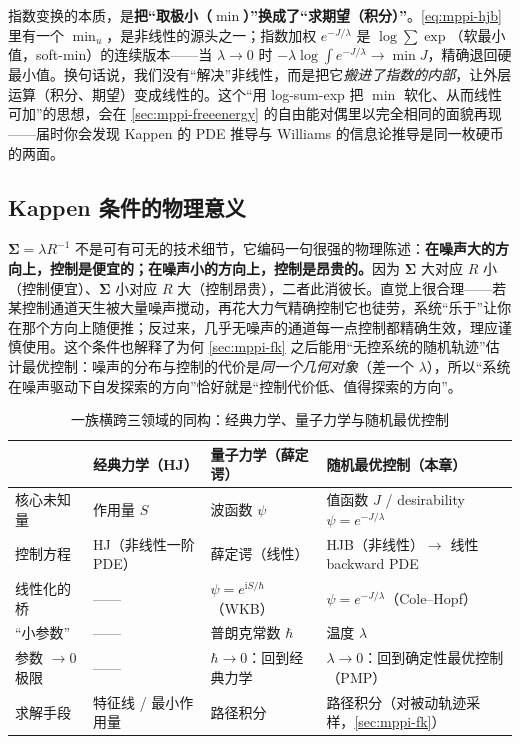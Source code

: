 \begin{insight}
指数变换的本质，是\textbf{把“取极小（$\min$）”换成了“求期望（积分）”}。\cref{eq:mppi-hjb} 里有一个 $\min_u$，是非线性的源头之一；指数加权 $e^{-J/\lambda}$ 是 $\log\!\sum\!\exp$（软最小值，soft-min）的连续版本——当 $\lambda\to0$ 时 $-\lambda\log\int e^{-J/\lambda}\to\min J$，精确退回硬最小值。换句话说，我们没有“解决”非线性，而是把它\emph{搬进了指数的内部}，让外层运算（积分、期望）变成线性的。这个“用 log-sum-exp 把 $\min$ 软化、从而线性可加”的思想，会在 \cref{sec:mppi-freeenergy} 的自由能对偶里以完全相同的面貌再现——届时你会发现 Kappen 的 PDE 推导与 Williams 的信息论推导是同一枚硬币的两面。
\end{insight}

\subsection{Kappen 条件的物理意义}
\label{sec:mppi-kappen-physics}

$\boldsymbol{\Sigma}=\lambda R^{-1}$ 不是可有可无的技术细节，它编码一句很强的物理陈述：\textbf{在噪声大的方向上，控制是便宜的；在噪声小的方向上，控制是昂贵的。}因为 $\boldsymbol{\Sigma}$ 大对应 $R$ 小（控制便宜）、$\boldsymbol{\Sigma}$ 小对应 $R$ 大（控制昂贵），二者此消彼长。直觉上很合理——若某控制通道天生被大量噪声搅动，再花大力气精确控制它也徒劳，系统“乐于”让你在那个方向上随便推；反过来，几乎无噪声的通道每一点控制都精确生效，理应谨慎使用。这个条件也解释了为何 \cref{sec:mppi-fk} 之后能用“无控系统的随机轨迹”估计最优控制：噪声的分布与控制的代价是\emph{同一个几何对象}（差一个 $\lambda$），所以“系统在噪声驱动下自发探索的方向”恰好就是“控制代价低、值得探索的方向”。

\begin{table}[H]\centering\small
\caption{一族横跨三领域的同构：经典力学、量子力学与随机最优控制}
\label{tab:mppi-trinity}
\begin{tabular}{p{}p{}p{}p{}}
\toprule
 & 经典力学（HJ） & 量子力学（薛定谔） & 随机最优控制（本章） \\
\midrule
核心未知量 & 作用量 $S$ & 波函数 $\psi$ & 值函数 $J$ / desirability $\psi=e^{-J/\lambda}$ \\
控制方程 & HJ（非线性一阶 PDE） & 薛定谔（线性） & HJB（非线性）$\to$ 线性 backward PDE \\
线性化的桥 & —— & $\psi=e^{\mathrm{i}S/\hbar}$（WKB） & $\psi=e^{-J/\lambda}$（Cole--Hopf） \\
“小参数” & —— & 普朗克常数 $\hbar$ & 温度 $\lambda$ \\
参数 $\to0$ 极限 & —— & $\hbar\to0$：回到经典力学 & $\lambda\to0$：回到确定性最优控制（PMP） \\
求解手段 & 特征线 / 最小作用量 & 路径积分 & 路径积分（对被动轨迹采样，\cref{sec:mppi-fk}） \\
\bottomrule
\end{tabular}
\end{table}

